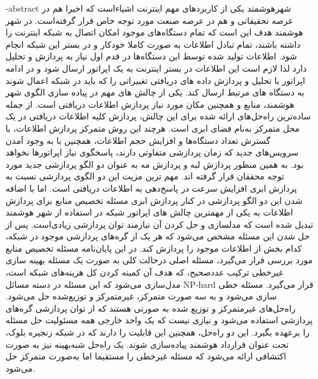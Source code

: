 \fa-abstract{
	شهرهوشمند یکی از کاربردهای مهم اینترنت اشیاءاست که اخیرا هم در عرصه تحقیقاتی و هم در عرصه صنعت مورد توجه خاص قرار گرفته‌است. در شهر هوشمند هدف این است که تمام دستگاه‌های موجود امکان اتصال به شبکه اینترنت را داشته باشند، تمام تبادل اطلاعات به صورت کاملا خودکار و در بستر این شبکه انجام شود. اطلاعات تولید شده توسط این دستگاه‌ها در قدم اول نیاز به پردازش و تحلیل دارد لذا لازم است این اطلاعات در بستر اینترنت به یک اپراتور ارسال شود و در ادامه اپراتور با تحلیل و پردازش داده های دریافتی تغییراتی را که باید در شبکه اعمال شوند به دستگاه های مرتبط ارسال کند.
	یکی از چالش های مهم در پیاده سازی الگوی شهر هوشمند، منابع و همچنین مکان مورد نیاز پردازش اطلاعات دریافتی است. از جمله ساده‌ترین راه‌حل‌های ارائه شده برای این چالش، پردازش کلیه‌ اطلاعات دریافتی در یک محل متمرکز به‌نام فضای ابری است. هرچند این روش متمرکز پردازش اطلاعات، با گسترش تعداد دستگاه‌ها و افزایش حجم اطلاعات، همچنین با به وجود آمدن سرویس‌های جدید که زمان پردازشی متفاوتی دارند، پاسخگوی نیاز اپراتورها نخواهد بود.
	به همین منظور پردازش لبه و پردازش مه به عنوان دو الگو پردازشی جدید مورد توجه محققان قرار گرفته اند. مهم ترین مزیت این دو الگوی پردازشی نسبت به پردازش ابری افزایش سرعت در پاسخ‌دهی به اطلاعات دریافتی است. اما با اضافه شدن این دو الگو پردازشی در کنار پردازش ابری مسئله تخصیص منابع برای پردازش اطلاعات به یکی از مهمترین چالش های اپراتور شبکه در استفاده از شهر هوشمند تبدیل شده است که مدلسازی و حل کردن آن نیازمند توان پردازشی زیادی‌است. پس از حل شدن این مسئله مشخص می‌شود که هر یک از گره‌های پردازشی موجود در شبکه، کدام بخش از اطلاعات موجود را پردازش کند. 
	در این پایان‌نامه مسئله تخصیص منابع مورد بررسی قرار می‌گیرد، مسئله اصلی درحالت کلی به صورت یک مسئله بهینه سازی غیرخطی ترکیب عددصحیح، که هدف آن کمینه کردن کل هزینه‌های شبکه است، مدل‌سازی می‌شود که این مسئله در دسته مسائل NP-hard قرار می‌گیرد. 
	مسئله خطی سازی می‌شود و به سه صورت متمرکز، غیرمتمرکز و توزیع‌شده حل می‌شود. راه‌حل‌های غیرمتمرکز و توزیع شده به صورتی هستند که از توان پردازشی گره‌های پردازشی استفاده می‌شود و نیازی نیست که یک واحد خارجی همه مسئولیت حل مسئله را برعهده بگیرد. این دو راه‌حل، همچنین این قابلیت را دارند که در شبکه زنجیره‌ بلوک، تحت عنوان قرارداد هوشمند پیاده‌سازی شوند.
	یک راه‌حل شبه‌بهینه نیز به صورت اکتشافی ارائه می‌شود که مسئله غیرخطی را مستقیما اما به‌صورت متمرکز حل می‌شود. 
}

\cleartorightpage
\abstractPage

\cleartorightpage
